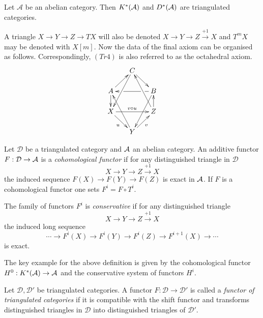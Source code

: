 \begin{proposition}{\cite[Proposition 1.2.4. ]{dimca2004sheaves}}
 Let $\mathcal{A}$ be an abelian category. Then $K^*(\AA)$ and $D^*(\AA)$ are triangulated categories.
\end{proposition}
A triangle $X\to Y \to Z \to TX$ will also be denoted $X\to Y \to Z \xrightarrow{+1} X$ and $T^m X$ may be denoted with $X[m]$.
Now the data of the final axiom can be organised as follows.
Correspondingly, $(Tr4)$ is also referred to as the octahedral axiom.
\begin{equation*}
\xymatrix@=1.6em{
& C \ar@{->}[dr] \ar[ddl] & \\
A \ar@{->}[ur] \ar[d]& &
   B\ar[ll]|(0.25)\hole|(0.75)\hole
      \ar[ddl] \\
X \ar[rr]^{v \circ u} \ar[dr]_u & &
   Z \ar[u] \ar[uul]\\
& Y \ar[ur]_v \ar[uul]&
}
\end{equation*}

\begin{definition}
 Let $\mathcal{D}$ be a triangulated category and $\AA$ an abelian category.
 An additive functor $F:\mathcal{D} \to \AA$ is a {\it cohomological functor} if for any distinguished triangle in $\mathcal{D}$
 $$X \to Y \to Z\xrightarrow{+1} X $$
 the induced sequence $F(X) \to F(Y) \to F(Z) $
 is exact in $\AA$.
 If $F$ is a cohomological functor one sets $F^i = F\circ T^i$.

 The family of functors $F^i$ is {\it conservative} if for any distinguished triangle
 $$X \to Y \to Z \xrightarrow{+1} X$$
 the induced long sequence
 $$\cdots \to F^i(X) \to F^i(Y) \to F^i(Z) \to F^{i+1}(X) \to \cdots $$
 is exact.
\end{definition}
The key example for the above definition is given by the cohomological functor $H^0: K^*(\AA) \to \AA$ and the conservative system of functors $H^i$.
\begin{definition}
 Let $\mathcal{D}, \mathcal{D}'$ be triangulated categories.
 A functor $F:\mathcal{D} \to \mathcal{D}'$ is called a {\it functor of triangulated categories} if it is compatible with the shift functor and transforms distinguished triangles in $\mathcal{D}$ into distinguished triangles of $\mathcal{D}'$.
\end{definition}
